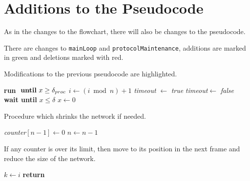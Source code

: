 \newpage
\section{Additions to the Pseudocode}
As in the changes to the flowchart, there will also be changes to the pseudocode. 

There are changes to \texttt{mainLoop} and \texttt{protocolMaintenance}, additions are marked in green and deletions marked with red.

\begin{algorithm}[H]
\caption{Modifications to the previous pseudocode are highlighted.}
\label{lst:general_case2}
\begin{algorithmic}[1]
    \Repeat
        \State \textbf{run}  $\text{ \textbf{until} }x \ge \delta_{proc}$ 
        \State $i \gets (i \bmod n) + 1$  
                \CState {}
            \CEndIf
            \State {} 
            \State {}
                \CState {}
            \CEndIf
        \Else
            \CState \textit{timeout} $\gets$ \textit{true}
                    \State {}
                    \State {}
                    \CState \textit{timeout}$ \gets$  \textit{false}
                \EndIf
            \EndWhile
            \CState {}
        \EndIf
        \State \textbf{wait until } $x \le \delta$
        \State $x \gets 0$ 
\EndProcedure
\end{algorithmic}    
\end{algorithm}

\begin{algorithm}[H]
\caption{Procedure which shrinks the network if needed.}
\label{lst:general_case5}
\begin{algorithmic}[1]
        \State \textit{counter}$[n-1] \gets 0$
        \State $n \gets n - 1$
    \EndIf
\EndProcedure
\end{algorithmic}    
\end{algorithm} 

\begin{algorithm}[H]
\caption{If any counter is over its limit, then move to its position in the next frame and reduce the size of the network.}
\label{lst:general_case4}
\begin{algorithmic}[1]
            \State $k \gets i$
            \State \textbf{return}
        \EndIf
    \EndFor 
\EndProcedure
\end{algorithmic}    
\end{algorithm} 

